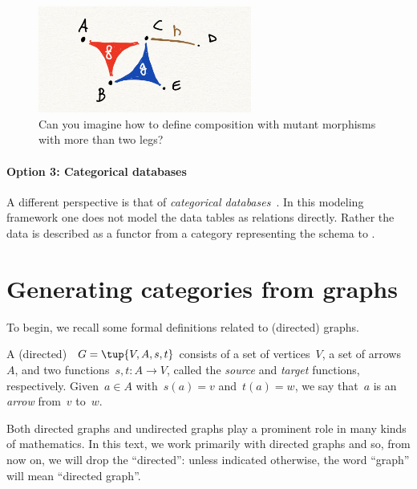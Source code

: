 \begin{figure}[h]
    \centering
    \includegraphics[width=7cm]{mutants}
    \caption{Can you imagine how to define
    composition with mutant morphisms
    with more than two legs?}
\end{figure}

\paragraph{Option 3: Categorical databases}

A different perspective is that of \emph{categorical databases}~\cite{spivak2019categorical}. In this modeling framework
one does not model the data tables as relations directly.
Rather the data is described as a functor
from a category representing the schema
to \Set.


\section{Generating categories from graphs}
\label{sec:catsfromgraphs}
To begin, we recall some formal definitions related to (directed) graphs.


\begin{definition}[Graph]\label{def:graph}
    A (directed) \emph{}~$G=\tup{V,A,s,t}$ consists of a set of vertices~$V$, a set of arrows~$A$, and two functions~$s,t\colon A\to V$, called the \emph{source} and \emph{target} functions, respectively. Given~$a\in A$ with~$s(a)=v$ and~$t(a)=w$, we say that~$a$ is an \emph{arrow} from~$v$ to~$w$.
\end{definition}

\begin{remark}
    Both directed graphs and undirected graphs play a prominent role in many kinds of mathematics. In this text, we work primarily with directed graphs and so, from now on, we will drop the ``directed'': unless indicated otherwise, the word ``graph'' will mean ``directed graph''.
\end{remark}

